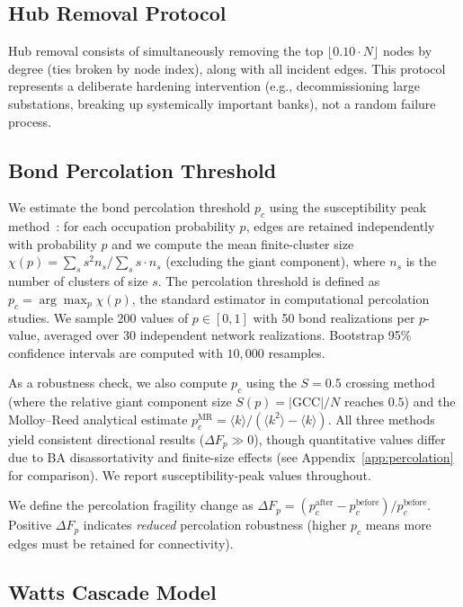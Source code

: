 \documentclass[aps,pre,twocolumn,superscriptaddress,showpacs]{revtex4-2}
\newcommand{\avg}[1]{\langle #1 \rangle}
\newcommand{\pc}{p_c}
\newcommand{\DF}{\Delta F}
\begin{document}
\subsection{Hub Removal Protocol}

Hub removal consists of simultaneously removing the top $\lfloor 0.10 \cdot N \rfloor$ nodes by degree (ties broken by node index), along with all incident edges. This protocol represents a deliberate hardening intervention (e.g., decommissioning large substations, breaking up systemically important banks), not a random failure process.

\subsection{Bond Percolation Threshold}

We estimate the bond percolation threshold $\pc$ using the susceptibility peak method~\cite{Newman2001}: for each occupation probability $p$, edges are retained independently with probability $p$ and we compute the mean finite-cluster size $\chi(p) = \sum_s s^2 n_s / \sum_s s \cdot n_s$ (excluding the giant component), where $n_s$ is the number of clusters of size $s$. The percolation threshold is defined as $\pc = \arg\max_p \chi(p)$, the standard estimator in computational percolation studies. We sample 200 values of $p \in [0,1]$ with 50 bond realizations per $p$-value, averaged over 30 independent network realizations. Bootstrap 95\% confidence intervals are computed with $10{,}000$ resamples.

As a robustness check, we also compute $\pc$ using the $S=0.5$ crossing method (where the relative giant component size $S(p) = |\mathrm{GCC}|/N$ reaches $0.5$) and the Molloy--Reed analytical estimate $p_c^{\mathrm{MR}} = \avg{k}/(\avg{k^2} - \avg{k})$. All three methods yield consistent directional results ($\DF_p \gg 0$), though quantitative values differ due to BA disassortativity and finite-size effects (see Appendix~\ref{app:percolation} for comparison). We report susceptibility-peak values throughout.

We define the percolation fragility change as $\DF_p = (\pc^{\mathrm{after}} - \pc^{\mathrm{before}})/\pc^{\mathrm{before}}$. Positive $\DF_p$ indicates \emph{reduced} percolation robustness (higher $\pc$ means more edges must be retained for connectivity).

\subsection{Watts Cascade Model}
\end{document}
